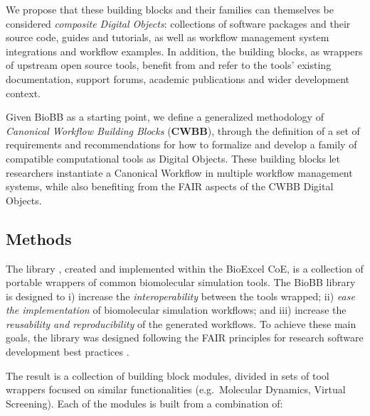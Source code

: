 We propose that these building blocks and their families can themselves be considered \emph{composite Digital Objects}: collections of software packages and their source code, guides and tutorials, as well as workflow management system integrations and workflow examples.
In addition, the building blocks, as wrappers of upstream open source tools, benefit from and refer to the tools' existing documentation, support forums, academic publications and wider development context.

Given BioBB as a starting point, we define a generalized methodology of \emph{Canonical Workflow Building Blocks} (\textbf{CWBB}), through the definition of a set of requirements and recommendations for how to formalize and develop a family of compatible computational tools as Digital Objects.
These building blocks let researchers instantiate a Canonical Workflow in multiple workflow management systems, while also benefiting from the FAIR aspects of the CWBB Digital Objects.

\subsection{Methods}\label{ch6:methods}

The  library \cite{ch6-10}, created and implemented within the BioExcel CoE, is a collection of portable wrappers of common biomolecular simulation tools.
The BioBB library is designed to i) increase the \emph{interoperability} between the tools wrapped; ii) \emph{ease the implementation} of biomolecular simulation workflows; and iii) increase the \emph{reusability and reproducibility} of the generated workflows.
To achieve these main goals, the library was designed following the FAIR principles for research software development best practices \cite{Lamprecht 2019}.

The result is a collection of building block modules, divided in sets of tool wrappers focused on similar functionalities (e.g.~Molecular Dynamics, Virtual Screening).
Each of the modules is built from a combination of:

